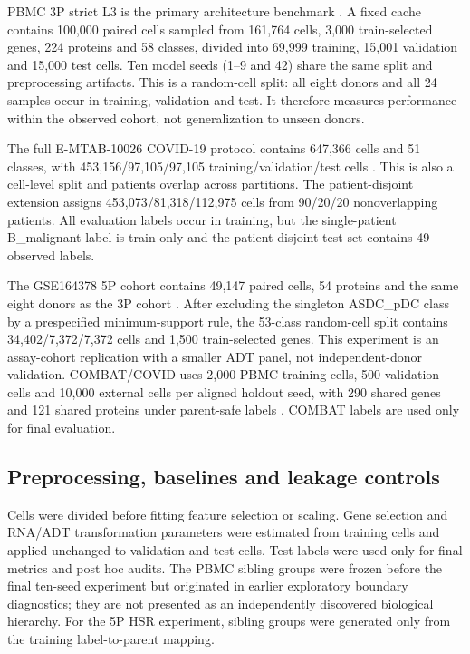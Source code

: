\documentclass[unnumsec,webpdf,contemporary,large,numbered]{oup-authoring-template}
\begin{document}
PBMC 3P strict L3 is the primary architecture benchmark \citep{hao2021}. A fixed cache contains 100,000 paired cells sampled from 161,764 cells, 3,000 train-selected genes, 224 proteins and 58 classes, divided into 69,999 training, 15,001 validation and 15,000 test cells. Ten model seeds (1--9 and 42) share the same split and preprocessing artifacts. This is a random-cell split: all eight donors and all 24 samples occur in training, validation and test. It therefore measures performance within the observed cohort, not generalization to unseen donors.

The full E-MTAB-10026 COVID-19 protocol contains 647,366 cells and 51 classes, with 453,156/97,105/97,105 training/validation/test cells \citep{stephenson2021}. This is also a cell-level split and patients overlap across partitions. The patient-disjoint extension assigns 453,073/81,318/112,975 cells from 90/20/20 nonoverlapping patients. All evaluation labels occur in training, but the single-patient B\_malignant label is train-only and the patient-disjoint test set contains 49 observed labels.

The GSE164378 5P cohort contains 49,147 paired cells, 54 proteins and the same eight donors as the 3P cohort \citep{hao2021}. After excluding the singleton ASDC\_pDC class by a prespecified minimum-support rule, the 53-class random-cell split contains 34,402/7,372/7,372 cells and 1,500 train-selected genes. This experiment is an assay-cohort replication with a smaller ADT panel, not independent-donor validation. COMBAT/COVID uses 2,000 PBMC training cells, 500 validation cells and 10,000 external cells per aligned holdout seed, with 290 shared genes and 121 shared proteins under parent-safe labels \citep{combat2022}. COMBAT labels are used only for final evaluation.

\subsection{Preprocessing, baselines and leakage controls}

Cells were divided before fitting feature selection or scaling. Gene selection and RNA/ADT transformation parameters were estimated from training cells and applied unchanged to validation and test cells. Test labels were used only for final metrics and post hoc audits. The PBMC sibling groups were frozen before the final ten-seed experiment but originated in earlier exploratory boundary diagnostics; they are not presented as an independently discovered biological hierarchy. For the 5P HSR experiment, sibling groups were generated only from the training label-to-parent mapping.
\end{document}
